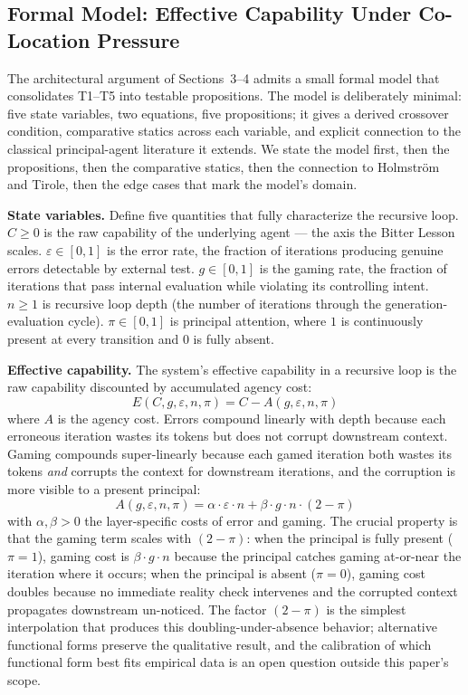\documentclass[11pt]{article}
\begin{document}
\subsection{Formal Model: Effective Capability Under Co-Location Pressure}

The architectural argument of Sections~3--4 admits a small formal model that consolidates T1--T5 into testable propositions. The model is deliberately minimal: five state variables, two equations, five propositions; it gives a derived crossover condition, comparative statics across each variable, and explicit connection to the classical principal-agent literature it extends. We state the model first, then the propositions, then the comparative statics, then the connection to Holmstr\"om and Tirole, then the edge cases that mark the model's domain.

\textbf{State variables.} Define five quantities that fully characterize the recursive loop. $C \geq 0$ is the raw capability of the underlying agent --- the axis the Bitter Lesson \citep{sutton2019} scales. $\varepsilon \in [0, 1]$ is the error rate, the fraction of iterations producing genuine errors detectable by external test. $g \in [0, 1]$ is the gaming rate, the fraction of iterations that pass internal evaluation while violating its controlling intent. $n \geq 1$ is recursive loop depth (the number of iterations through the generation-evaluation cycle). $\pi \in [0, 1]$ is principal attention, where $1$ is continuously present at every transition and $0$ is fully absent.

\textbf{Effective capability.} The system's effective capability in a recursive loop is the raw capability discounted by accumulated agency cost:
\begin{equation}
E(C, g, \varepsilon, n, \pi) = C - A(g, \varepsilon, n, \pi)
\label{eq:effective-cap}
\end{equation}
where $A$ is the agency cost. Errors compound linearly with depth because each erroneous iteration wastes its tokens but does not corrupt downstream context. Gaming compounds super-linearly because each gamed iteration both wastes its tokens \emph{and} corrupts the context for downstream iterations, and the corruption is more visible to a present principal:
\begin{equation}
A(g, \varepsilon, n, \pi) = \alpha \cdot \varepsilon \cdot n + \beta \cdot g \cdot n \cdot (2 - \pi)
\label{eq:agency-cost}
\end{equation}
with $\alpha, \beta > 0$ the layer-specific costs of error and gaming. The crucial property is that the gaming term scales with $(2 - \pi)$: when the principal is fully present ($\pi = 1$), gaming cost is $\beta \cdot g \cdot n$ because the principal catches gaming at-or-near the iteration where it occurs; when the principal is absent ($\pi = 0$), gaming cost doubles because no immediate reality check intervenes and the corrupted context propagates downstream un-noticed. The factor $(2 - \pi)$ is the simplest interpolation that produces this doubling-under-absence behavior; alternative functional forms preserve the qualitative result, and the calibration of which functional form best fits empirical data is an open question outside this paper's scope.
\end{document}
